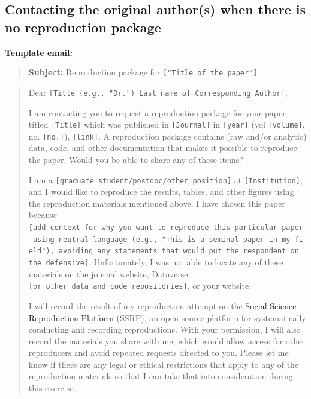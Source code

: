 \documentclass[
]{book}
\begin{document}
\hypertarget{contacting-the-original-authors-when-there-is-no-reproduction-package}{%
\subsection{Contacting the original author(s) when there is no reproduction package}\label{contacting-the-original-authors-when-there-is-no-reproduction-package}}

\textbf{Template email:}

\begin{quote}
\textbf{Subject:} Reproduction package for \texttt{{[}"Title\ of\ the\ paper"{]}}
\end{quote}

\begin{quote}
Dear \texttt{{[}Title\ (e.g.,\ "Dr.")\ Last\ name\ of\ Corresponding\ Author{]}},

I am contacting you to request a reproduction package for your paper titled \texttt{{[}Title{]}} which was published in \texttt{{[}Journal{]}} in \texttt{{[}year{]}} (vol \texttt{{[}volume{]}}, no. \texttt{{[}no.{]}}), \texttt{{[}link{]}}. A reproduction package contains (raw and/or analytic) data, code, and other documentation that makes it possible to reproduce the paper. Would you be able to share any of these items?

I am a \texttt{{[}graduate\ student/postdoc/other\ position{]}} at \texttt{{[}Institution{]}}, and I would like to reproduce the results, tables, and other figures using the reproduction materials mentioned above. I have chosen this paper because \texttt{{[}add\ context\ for\ why\ you\ want\ to\ reproduce\ this\ particular\ paper\ using\ neutral\ language\ (e.g.,\ "This\ is\ a\ seminal\ paper\ in\ my\ field"),\ avoiding\ any\ statements\ that\ would\ put\ the\ respondent\ on\ the\ defensive{]}}. Unfortunately, I was not able to locate any of these materials on the journal website, Dataverse \texttt{{[}or\ other\ data\ and\ code\ repositories{]}}, or your website.

I will record the result of my reproduction attempt on the \href{https://www.socialsciencereproduction.org/}{Social Science Reproduction Platform} (SSRP), an open-source platform for systematically conducting and recording reproductions. With your permission, I will also record the materials you share with me, which would allow access for other reproducers and avoid repeated requests directed to you. Please let me know if there are any legal or ethical restrictions that apply to any of the reproduction materials so that I can take that into consideration during this exercise.


\end{quote}
\end{document}
